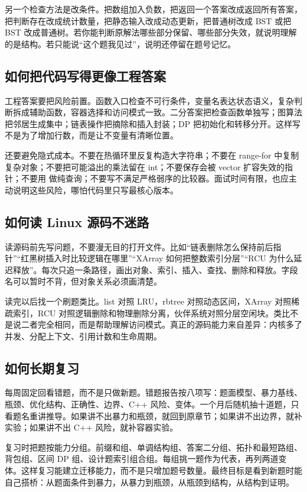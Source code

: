 另一个检查方法是改条件。把数组加入负数，把返回一个答案改成返回所有答案，把判断存在改成统计数量，把静态输入改成动态更新，把普通树改成 BST 或把 BST 改成普通树。若你能判断原解法哪些部分保留、哪些部分失效，就说明理解的是结构。若只能说“这个题我见过”，说明还停留在题号记忆。

\subsection{如何把代码写得更像工程答案}

工程答案要把风险前置。函数入口检查不可行条件，变量名表达状态语义，复杂判断拆成辅助函数，容器选择和访问模式一致。二分答案把检查函数单独写；图算法把邻居生成集中；链表操作把摘除和插入封装；DP 把初始化和转移分开。这样写不是为了增加行数，而是让不变量有清晰位置。

还要避免隐式成本。不要在热循环里反复构造大字符串；不要在 range-for 中复制复杂对象；不要把可能溢出的乘法留在 int；不要保存会被 vector 扩容失效的指针；不要用  做纯查询；不要写不满足严格弱序的比较器。面试时间有限，也应主动说明这些风险，哪怕代码里只写最核心版本。

\subsection{如何读 Linux 源码不迷路}

读源码前先写问题，不要漫无目的打开文件。比如“链表删除怎么保持前后指针”“红黑树插入时比较逻辑在哪里”“XArray 如何把整数索引分层”“RCU 为什么延迟释放”。每次只追一条路径，画出对象、索引、插入、查找、删除和释放。字段名可以暂时不背，但对象关系必须画清楚。

读完以后找一个刷题类比。list 对照 LRU，rbtree 对照动态区间，XArray 对照稀疏索引，RCU 对照逻辑删除和物理删除分离，伙伴系统对照分层空闲块。类比不是说二者完全相同，而是帮助理解访问模式。真正的源码能力来自差异：内核多了并发、分配上下文、引用计数和生命周期。

\subsection{如何长期复习}

每周固定回看错题，而不是只做新题。错题报告按八项写：题面模型、暴力基线、瓶颈、优化结构、正确性、边界、C++ 风险、变体。一个月后随机抽十道题，只看题名重讲推导。如果讲不出暴力和瓶颈，就回到原章节；如果讲不出边界，就补实验；如果讲不出 C++ 风险，就补容器实验。

复习时把题按能力分组。前缀和组、单调结构组、答案二分组、拓扑和最短路组、背包组、区间 DP 组、设计题索引组合组。每组挑一题作为代表，再列两道变体。这样复习能建立迁移能力，而不是只增加题号数量。最终目标是看到新题时能自己搭桥：从题面条件到暴力，从暴力到瓶颈，从瓶颈到结构，从结构到证明。
